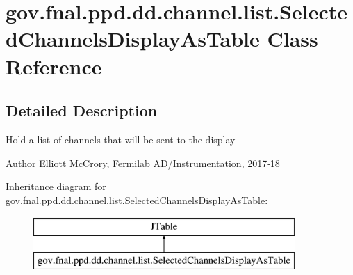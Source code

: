 \hypertarget{classgov_1_1fnal_1_1ppd_1_1dd_1_1channel_1_1list_1_1SelectedChannelsDisplayAsTable}{\section{gov.\-fnal.\-ppd.\-dd.\-channel.\-list.\-Selected\-Channels\-Display\-As\-Table Class Reference}
\label{classgov_1_1fnal_1_1ppd_1_1dd_1_1channel_1_1list_1_1SelectedChannelsDisplayAsTable}
}


\subsection{Detailed Description}
Hold a list of channels that will be sent to the display

\begin{DoxyAuthor}{Author}
Elliott Mc\-Crory, Fermilab A\-D/\-Instrumentation, 2017-\/18 
\end{DoxyAuthor}
Inheritance diagram for gov.\-fnal.\-ppd.\-dd.\-channel.\-list.\-Selected\-Channels\-Display\-As\-Table\-:\begin{figure}[H]
\begin{center}
\leavevmode
\includegraphics[height=2.000000cm]{classgov_1_1fnal_1_1ppd_1_1dd_1_1channel_1_1list_1_1SelectedChannelsDisplayAsTable}
\end{center}
\end{figure}
